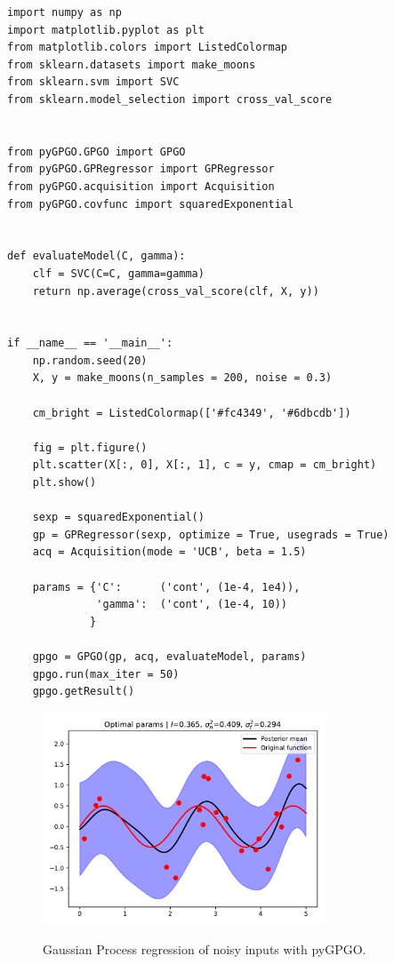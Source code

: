 \documentclass[10pt,a4paper,twoside]{book}
\begin{document}
\begin{verbatim}
import numpy as np
import matplotlib.pyplot as plt
from matplotlib.colors import ListedColormap
from sklearn.datasets import make_moons
from sklearn.svm import SVC
from sklearn.model_selection import cross_val_score


from pyGPGO.GPGO import GPGO
from pyGPGO.GPRegressor import GPRegressor
from pyGPGO.acquisition import Acquisition
from pyGPGO.covfunc import squaredExponential


def evaluateModel(C, gamma):
    clf = SVC(C=C, gamma=gamma)
    return np.average(cross_val_score(clf, X, y))
    

if __name__ == '__main__':
    np.random.seed(20)
    X, y = make_moons(n_samples = 200, noise = 0.3)

    cm_bright = ListedColormap(['#fc4349', '#6dbcdb'])
    
    fig = plt.figure()
    plt.scatter(X[:, 0], X[:, 1], c = y, cmap = cm_bright)
    plt.show()
    
    sexp = squaredExponential()
    gp = GPRegressor(sexp, optimize = True, usegrads = True)
    acq = Acquisition(mode = 'UCB', beta = 1.5)

    params = {'C':      ('cont', (1e-4, 1e4)),
              'gamma':  ('cont', (1e-4, 10))
             }

    gpgo = GPGO(gp, acq, evaluateModel, params)
    gpgo.run(max_iter = 50)
    gpgo.getResult()               
\end{verbatim}

\FloatBarrier
\begin{figure}
\centering
\caption{Gaussian Process regression of noisy inputs with pyGPGO.}
\includegraphics[width=0.75\textwidth]{figures/chapter5/noiseopt}
\label{fig:noiseopt}
\end{figure}
\end{document}
